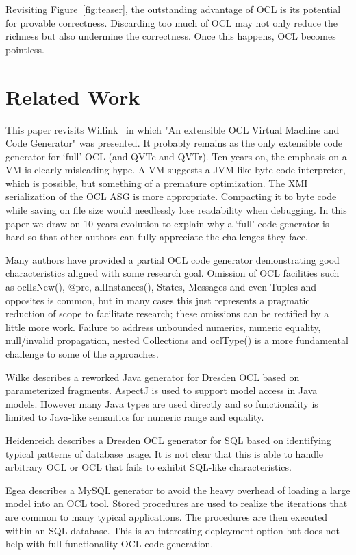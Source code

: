 \documentclass[sigconf]{acmart}
\begin{document}
Revisiting Figure~\ref{fig:teaser}, the outstanding advantage of OCL is its potential for provable correctness. Discarding too much of OCL may not only reduce the richness but also undermine the correctness. Once this happens, OCL becomes pointless.

\section{Related Work}\label{Related Work}

This paper revisits Willink~\cite{Willink2012} in which "An extensible OCL Virtual Machine and Code Generator" was presented. It probably remains as the only extensible code generator for `full' OCL (and QVTc and QVTr). Ten years on, the emphasis on a VM is clearly misleading hype. A VM suggests a JVM-like byte code interpreter, which is possible, but something of a premature optimization. The XMI serialization of the OCL ASG is more appropriate. Compacting it to byte code while saving on file size would needlessly lose readability when debugging. In this paper we draw on 10 years evolution to explain why a `full' code generator is hard so that other authors can fully appreciate the challenges they face.

Many authors have provided a partial OCL code generator demonstrating good characteristics aligned with some research goal. Omission of OCL facilities such as oclIsNew(), @pre,  allInstances(), States, Messages and even Tuples and opposites is common, but in many cases this just represents a pragmatic reduction of scope to facilitate research; these omissions can be rectified by a little more work. Failure to address unbounded numerics, numeric equality, null/invalid propagation, nested Collections and oclType() is a more fundamental challenge to some of the approaches. 

Wilke\cite{Dresden/JavaCG} describes a reworked  Java generator for Dresden OCL based on parameterized fragments.
AspectJ is used to support model access in Java models. However many Java types are used directly and so functionality is limited to Java-like semantics for numeric range and equality.

Heidenreich\cite{QueryCode} describes a Dresden OCL generator for SQL based on identifying typical patterns of database usage. It is not clear that this is able to handle arbitrary OCL or OCL that fails to exhibit SQL-like characteristics.

Egea\cite{MySQL4OCL} describes a MySQL generator to avoid the heavy overhead of loading a large model into an OCL tool. Stored procedures are used to realize the iterations that are common to many typical applications. The procedures are then executed within an SQL database. This is an interesting deployment option but does not help with full-functionality OCL code generation.
\end{document}

